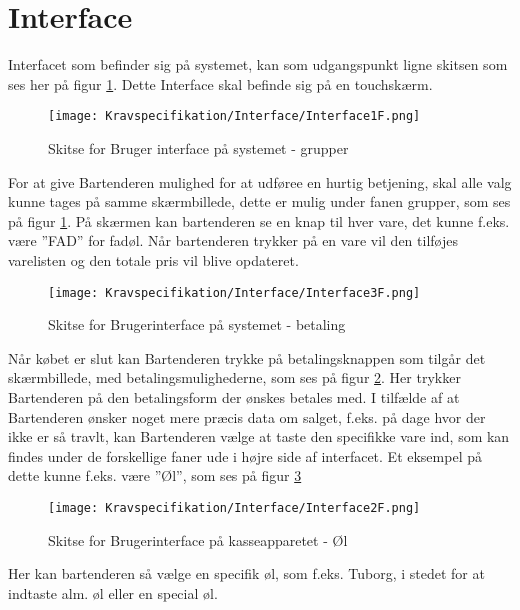 \section{Interface}
Interfacet som befinder sig på systemet, kan som udgangspunkt ligne skitsen som ses her på figur \ref{fig:Interface1}. Dette Interface skal befinde sig på en touchskærm.

\begin{figure}[ht]
	\centering
	\texttt{[image: Kravspecifikation/Interface/Interface1F.png]}
	\caption{Skitse for Bruger interface på systemet - grupper}
	\label{fig:Interface1}
\end{figure}

For at give Bartenderen mulighed for at udføree en hurtig betjening, skal alle valg kunne tages på samme skærmbillede, dette er mulig under fanen grupper, som ses på figur \ref{fig:Interface1}. 
\newline\newline
På skærmen kan bartenderen se en knap til hver vare, det kunne f.eks. være ''FAD'' for fadøl. Når bartenderen trykker på en vare vil den tilføjes varelisten og den totale pris vil blive opdateret. 

\begin{figure}[H]
	\centering
	\texttt{[image: Kravspecifikation/Interface/Interface3F.png]}
	\caption{Skitse for Brugerinterface på systemet - betaling}
	\label{fig:Interface3}
\end{figure}
Når købet er slut kan Bartenderen trykke på betalingsknappen som tilgår det skærmbillede, med betalingsmulighederne, som ses på figur \ref{fig:Interface3}. Her trykker Bartenderen på den betalingsform der ønskes betales med. 
\newpage
I tilfælde af at Bartenderen ønsker noget mere præcis data om salget, f.eks. på dage hvor der ikke er så travlt, kan Bartenderen vælge at taste den specifikke vare ind, som kan findes under de forskellige faner ude i højre side af interfacet. Et eksempel på dette kunne f.eks. være ''Øl'', som ses på figur \ref{fig:Interface2}

\begin{figure}[ht]
	\centering
	\texttt{[image: Kravspecifikation/Interface/Interface2F.png]}
	\caption{Skitse for Brugerinterface på kasseapparetet - Øl}
	\label{fig:Interface2}
\end{figure}

Her kan bartenderen så vælge en specifik øl, som f.eks. Tuborg, i stedet for at indtaste alm. øl eller en special øl.

